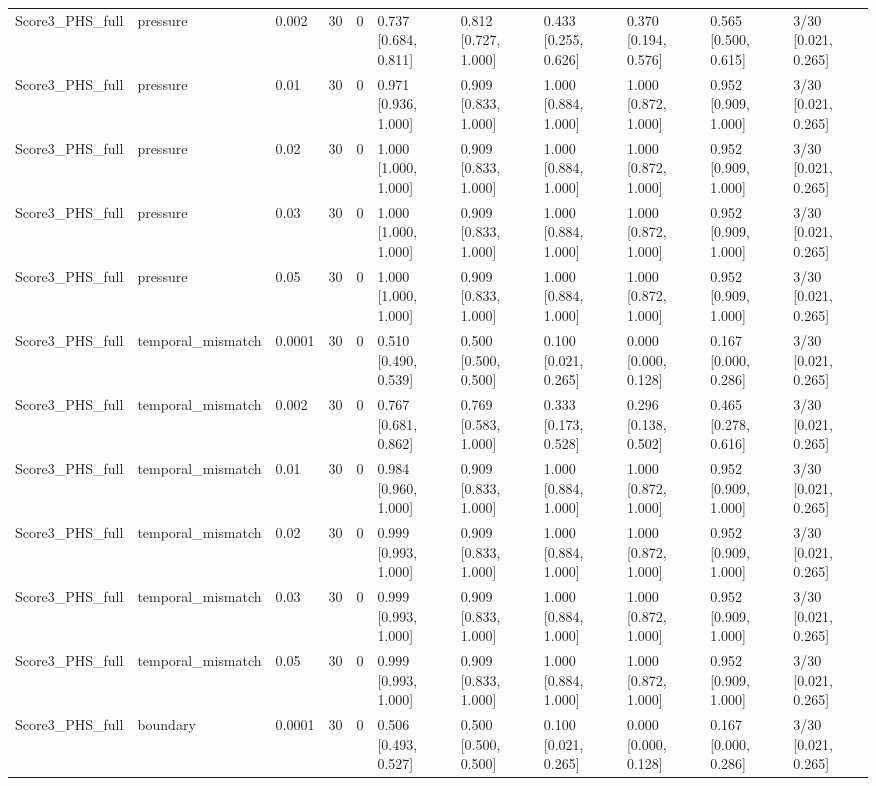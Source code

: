 \begin{longtable}{lllllllllll}
Score3\_PHS\_full & pressure & 0.002 & 30 & 0 & 0.737 [0.684, 0.811] & 0.812 [0.727, 1.000] & 0.433 [0.255, 0.626] & 0.370 [0.194, 0.576] & 0.565 [0.500, 0.615] & 3/30 [0.021, 0.265] \\
Score3\_PHS\_full & pressure & 0.01 & 30 & 0 & 0.971 [0.936, 1.000] & 0.909 [0.833, 1.000] & 1.000 [0.884, 1.000] & 1.000 [0.872, 1.000] & 0.952 [0.909, 1.000] & 3/30 [0.021, 0.265] \\
Score3\_PHS\_full & pressure & 0.02 & 30 & 0 & 1.000 [1.000, 1.000] & 0.909 [0.833, 1.000] & 1.000 [0.884, 1.000] & 1.000 [0.872, 1.000] & 0.952 [0.909, 1.000] & 3/30 [0.021, 0.265] \\
Score3\_PHS\_full & pressure & 0.03 & 30 & 0 & 1.000 [1.000, 1.000] & 0.909 [0.833, 1.000] & 1.000 [0.884, 1.000] & 1.000 [0.872, 1.000] & 0.952 [0.909, 1.000] & 3/30 [0.021, 0.265] \\
Score3\_PHS\_full & pressure & 0.05 & 30 & 0 & 1.000 [1.000, 1.000] & 0.909 [0.833, 1.000] & 1.000 [0.884, 1.000] & 1.000 [0.872, 1.000] & 0.952 [0.909, 1.000] & 3/30 [0.021, 0.265] \\
Score3\_PHS\_full & temporal\_mismatch & 0.0001 & 30 & 0 & 0.510 [0.490, 0.539] & 0.500 [0.500, 0.500] & 0.100 [0.021, 0.265] & 0.000 [0.000, 0.128] & 0.167 [0.000, 0.286] & 3/30 [0.021, 0.265] \\
Score3\_PHS\_full & temporal\_mismatch & 0.002 & 30 & 0 & 0.767 [0.681, 0.862] & 0.769 [0.583, 1.000] & 0.333 [0.173, 0.528] & 0.296 [0.138, 0.502] & 0.465 [0.278, 0.616] & 3/30 [0.021, 0.265] \\
Score3\_PHS\_full & temporal\_mismatch & 0.01 & 30 & 0 & 0.984 [0.960, 1.000] & 0.909 [0.833, 1.000] & 1.000 [0.884, 1.000] & 1.000 [0.872, 1.000] & 0.952 [0.909, 1.000] & 3/30 [0.021, 0.265] \\
Score3\_PHS\_full & temporal\_mismatch & 0.02 & 30 & 0 & 0.999 [0.993, 1.000] & 0.909 [0.833, 1.000] & 1.000 [0.884, 1.000] & 1.000 [0.872, 1.000] & 0.952 [0.909, 1.000] & 3/30 [0.021, 0.265] \\
Score3\_PHS\_full & temporal\_mismatch & 0.03 & 30 & 0 & 0.999 [0.993, 1.000] & 0.909 [0.833, 1.000] & 1.000 [0.884, 1.000] & 1.000 [0.872, 1.000] & 0.952 [0.909, 1.000] & 3/30 [0.021, 0.265] \\
Score3\_PHS\_full & temporal\_mismatch & 0.05 & 30 & 0 & 0.999 [0.993, 1.000] & 0.909 [0.833, 1.000] & 1.000 [0.884, 1.000] & 1.000 [0.872, 1.000] & 0.952 [0.909, 1.000] & 3/30 [0.021, 0.265] \\
Score3\_PHS\_full & boundary & 0.0001 & 30 & 0 & 0.506 [0.493, 0.527] & 0.500 [0.500, 0.500] & 0.100 [0.021, 0.265] & 0.000 [0.000, 0.128] & 0.167 [0.000, 0.286] & 3/30 [0.021, 0.265] \\

\end{longtable}

